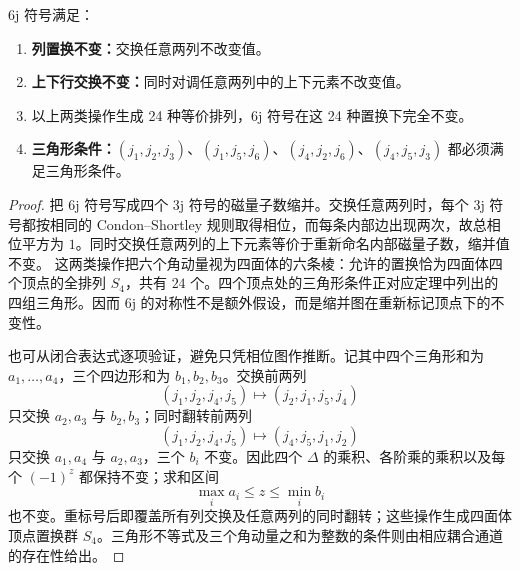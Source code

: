 \begin{proposition}[6j 符号的对称性质]
6j 符号满足：
\begin{enumerate}[label=(\roman*),leftmargin=3em]
\item \textbf{列置换不变：}交换任意两列不改变值。
\item \textbf{上下行交换不变：}同时对调任意两列中的上下元素不改变值。
\item 以上两类操作生成 24 种等价排列，6j 符号在这 24 种置换下完全不变。
\item \textbf{三角形条件：}$(j_1,j_2,j_3)$、$(j_1,j_5,j_6)$、$(j_4,j_2,j_6)$、$(j_4,j_5,j_3)$ 都必须满足三角形条件。
\end{enumerate}
\end{proposition}

\begin{proof}
把 6j 符号写成四个 3j 符号的磁量子数缩并。交换任意两列时，每个 3j 符号都按相同的 Condon--Shortley 规则取得相位，而每条内部边出现两次，故总相位平方为 $1$。同时交换任意两列的上下元素等价于重新命名内部磁量子数，缩并值不变。
这两类操作把六个角动量视为四面体的六条棱：允许的置换恰为四面体四个顶点的全排列 $S_4$，共有 $24$ 个。四个顶点处的三角形条件正对应定理中列出的四组三角形。因而 6j 的对称性不是额外假设，而是缩并图在重新标记顶点下的不变性。

也可从闭合表达式逐项验证，避免只凭相位图作推断。记其中四个三角形和为 $a_1,\dots,a_4$，三个四边形和为 $b_1,b_2,b_3$。交换前两列
\[
(j_1,j_2,j_4,j_5)\longmapsto(j_2,j_1,j_5,j_4)
\]
只交换 $a_2,a_3$ 与 $b_2,b_3$；同时翻转前两列
\[
(j_1,j_2,j_4,j_5)\longmapsto(j_4,j_5,j_1,j_2)
\]
只交换 $a_1,a_4$ 与 $a_2,a_3$，三个 $b_i$ 不变。因此四个 $\Delta$ 的乘积、各阶乘的乘积以及每个 $(-1)^z$ 都保持不变；求和区间
\[
\max_i a_i\le z\le\min_i b_i
\]
也不变。重标号后即覆盖所有列交换及任意两列的同时翻转；这些操作生成四面体顶点置换群 $S_4$。三角形不等式及三个角动量之和为整数的条件则由相应耦合通道的存在性给出。
\end{proof}

